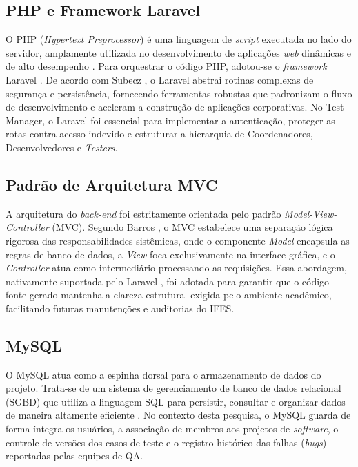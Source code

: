 \subsection{PHP e Framework Laravel}
O PHP (\textit{Hypertext Preprocessor}) é uma linguagem de \textit{script} executada no lado do servidor, amplamente utilizada no desenvolvimento de aplicações \textit{web} dinâmicas e de alto desempenho \cite{welling2003}. Para orquestrar o código PHP, adotou-se o \textit{framework} Laravel \cite{laravel2026}. De acordo com Subecz \cite{subecz2021}, o Laravel abstrai rotinas complexas de segurança e persistência, fornecendo ferramentas robustas que padronizam o fluxo de desenvolvimento e aceleram a construção de aplicações corporativas. No Test-Manager, o Laravel foi essencial para implementar a autenticação, proteger as rotas contra acesso indevido e estruturar a hierarquia de Coordenadores, Desenvolvedores e \textit{Testers}.

\subsection{Padrão de Arquitetura MVC}
A arquitetura do \textit{back-end} foi estritamente orientada pelo padrão \textit{Model-View-Controller} (MVC). Segundo Barros \cite{barrosMVC}, o MVC estabelece uma separação lógica rigorosa das responsabilidades sistêmicas, onde o componente \textit{Model} encapsula as regras de banco de dados, a \textit{View} foca exclusivamente na interface gráfica, e o \textit{Controller} atua como intermediário processando as requisições. Essa abordagem, nativamente suportada pelo Laravel \cite{subecz2021}, foi adotada para garantir que o código-fonte gerado mantenha a clareza estrutural exigida pelo ambiente acadêmico, facilitando futuras manutenções e auditorias do IFES.

\subsection{MySQL}
O MySQL atua como a espinha dorsal para o armazenamento de dados do projeto. Trata-se de um sistema de gerenciamento de banco de dados relacional (SGBD) que utiliza a linguagem SQL para persistir, consultar e organizar dados de maneira altamente eficiente \cite{welling2003}. No contexto desta pesquisa, o MySQL guarda de forma íntegra os usuários, a associação de membros aos projetos de \textit{software}, o controle de versões dos casos de teste e o registro histórico das falhas (\textit{bugs}) reportadas pelas equipes de QA.


